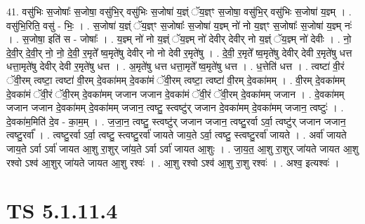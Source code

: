 \documentclass[17pt]{extarticle}
\begin{document}
41. वसु॑भिः स॒जोषाः᳚ स॒जोषा॒ वसु॑भि॒र् वसु॑भिः स॒जोषा॑ य॒ज्ञ्ं ॅय॒ज्ञ्ꣳ स॒जोषा॒ वसु॑भि॒र् वसु॑भिः स॒जोषा॑ य॒ज्ञ्म् । . वसु॑भि॒रिति॒ वसु॑ - भिः॒ । . स॒जोषा॑ य॒ज्ञ्ं ॅय॒ज्ञ्ꣳ स॒जोषाः᳚ स॒जोषा॑ य॒ज्ञ्म् नो॑ नो य॒ज्ञ्ꣳ स॒जोषाः᳚ स॒जोषा॑ य॒ज्ञ्म् नः॑ । . स॒जोषा॒ इति॑ स - जोषाः᳚ । . य॒ज्ञ्म् नो॑ नो य॒ज्ञ्ं ॅय॒ज्ञ्म् नो॑ देवीर् देवीर् नो य॒ज्ञ्ं ॅय॒ज्ञ्म् नो॑ देवीः । . नो॒ दे॒वी॒र् दे॒वी॒र् नो॒ नो॒ दे॒वी॒ र॒मृते᳚ ष्व॒मृते॑षु देवीर् नो नो देवी र॒मृते॑षु । . दे॒वी॒ र॒मृते᳚ ष्व॒मृते॑षु देवीर् देवी र॒मृते॑षु धत्त धत्ता॒मृते॑षु देवीर् देवी र॒मृते॑षु धत्त । . अ॒मृते॑षु धत्त धत्ता॒मृते᳚ ष्व॒मृते॑षु धत्त । . ध॒त्तेति॑ धत्त । . त्वष्टा॑ वी॒रं ॅवी॒रम् त्वष्टा॒ त्वष्टा॑ वी॒रम् दे॒वका॑मम् दे॒वका॑मं ॅवी॒रम् त्वष्टा॒ त्वष्टा॑ वी॒रम् दे॒वका॑मम् । . वी॒रम् दे॒वका॑मम् दे॒वका॑मं ॅवी॒रं ॅवी॒रम् दे॒वका॑मम् जजान जजान दे॒वका॑मं ॅवी॒रं ॅवी॒रम् दे॒वका॑मम् जजान । . दे॒वका॑मम् जजान जजान दे॒वका॑मम् दे॒वका॑मम् जजान॒ त्वष्टु॒ स्त्वष्टु॑र् जजान दे॒वका॑मम् दे॒वका॑मम् जजान॒ त्वष्टुः॑ । . दे॒वका॑म॒मिति॑ दे॒व - का॒म॒म् । . ज॒जा॒न॒ त्वष्टु॒ स्त्वष्टु॑र् जजान जजान॒ त्वष्टु॒रर्वा ऽर्वा॒ त्वष्टु॑र् जजान जजान॒ त्वष्टु॒रर्वा᳚ । . त्वष्टु॒रर्वा ऽर्वा॒ त्वष्टु॒ स्त्वष्टु॒रर्वा॑ जायते जाय॒ते ऽर्वा॒ त्वष्टु॒ स्त्वष्टु॒रर्वा॑ जायते । . अर्वा॑ जायते जाय॒ते ऽर्वा ऽर्वा॑ जायत आ॒शु रा॒शुर् जा॑य॒ते ऽर्वा ऽर्वा॑ जायत आ॒शुः । . जा॒य॒त॒ आ॒शु रा॒शुर् जा॑यते जायत आ॒शु रश्वो ऽश्व॑ आ॒शुर् जा॑यते जायत आ॒शु रश्वः॑ । . आ॒शु रश्वो ऽश्व॑ आ॒शु रा॒शु रश्वः॑ । . अश्व॒ इत्यश्वः॑ । \newline
\pagebreak
{}

\section{ TS 5.1.11.4 }
\end{document}
